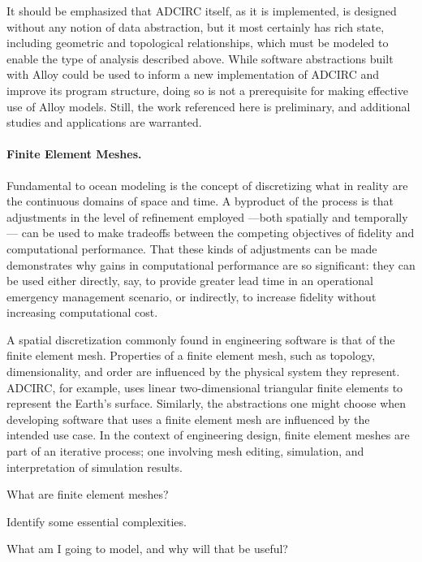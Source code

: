 \documentclass[12pt]{article}
\begin{document}
It should be emphasized that ADCIRC itself, as it is implemented, is designed without any notion of data abstraction, but it most certainly has rich state, including geometric and topological relationships, which must be modeled to enable the type of analysis described above. While software abstractions built with Alloy could be used to inform a new implementation of ADCIRC and improve its program structure, doing so is not a prerequisite for making effective use of Alloy models. Still, the work referenced here is preliminary, and additional studies and applications are warranted.

\paragraph{Finite Element Meshes.}  Fundamental to ocean modeling is the concept of discretizing what in reality are the continuous domains of space and time.  A byproduct of the process is that adjustments in the level of refinement employed ---both spatially and temporally--- can be used to make tradeoffs between the competing objectives of fidelity and computational performance.  That these kinds of adjustments can be made demonstrates why gains in computational performance are so significant: they can be used either directly, say, to provide greater lead time in an operational emergency management scenario, or indirectly, to increase fidelity without increasing computational cost.

A spatial discretization commonly found in engineering software is that of the finite element mesh.  Properties of a finite element mesh, such as topology, dimensionality, and order are influenced by the physical system they represent.  ADCIRC, for example, uses linear two-dimensional triangular finite elements to represent the Earth's surface.  Similarly, the abstractions one might choose when developing software that uses a finite element mesh are influenced by the intended use case.  In the context of engineering design, finite element meshes are part of an iterative process; one involving mesh editing, simulation, and interpretation of simulation results.


What are finite element meshes?

Identify some essential complexities.

What am I going to model, and why will that be useful?
\end{document}
